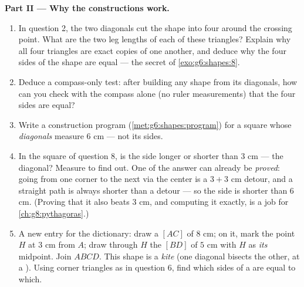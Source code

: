 \begin{problem}
\medskip
\noindent\textbf{Part II --- Why the constructions work.}
\begin{enumerate}[resume]
  \item In question 2, the two diagonals cut the shape into four
         around the crossing point. What are the
        two leg lengths of each of these triangles? Explain why
        all four triangles are exact copies of one another, and
        deduce why the four sides of the shape are equal --- the
        secret of \cref{exo:g6:shapes:8}.
  \item Deduce a compass-only test: after building any shape
        from its diagonals, how can you check with the compass
        alone (no ruler measurements) that the four sides are
        equal?
  \item Write a construction program
        (\cref{met:g6:shapes:program}) for a square whose
        \emph{diagonals} measure $6$ cm --- not its sides.
  \item In the square of question 8, is the side longer or
        shorter than $3$ cm ---  the diagonal? Measure to
        find out. One  of the answer can already be
        \emph{proved}: going from one corner to the next via the
        center is a $3 + 3$ cm detour, and a straight path is
        always shorter than a detour --- so the side is shorter
        than $6$ cm. (Proving that it also beats $3$ cm, and
        computing it exactly, is a job for
        \cref{ch:g8:pythagoras}.)
  \item A new entry for the dictionary: draw a  $[AC]$ of
        $8$ cm; on it, mark the point $H$ at $3$ cm from $A$;
        draw through $H$ the   $[BD]$ of
        $5$ cm with $H$ as \emph{its} midpoint. Join $ABCD$. This
        shape is a \emph{kite} (one diagonal bisects
        the other, at a ). Using corner triangles as
        in question 6, find which sides of a  are equal to
        which.
\end{enumerate}


\end{problem}

